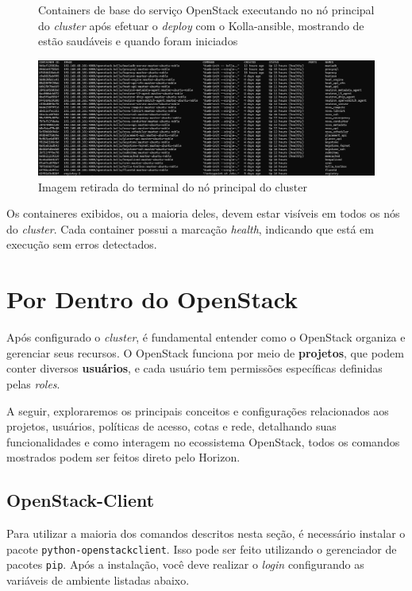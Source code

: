 \begin{figure}[htbp]
    \centering
    \caption{Containers de base do serviço OpenStack executando no nó principal do \textit{cluster} após efetuar o \textit{deploy} com o Kolla-ansible, mostrando de estão saudáveis e quando foram iniciados}
    \includegraphics[width=1.0\textwidth]{images/controller_containers.png}
    \caption{Imagem retirada do terminal do nó principal do cluster}
    \label{fig:controller_containers}
\end{figure}

Os containeres exibidos, ou a maioria deles, devem estar visíveis em todos os nós do \textit{cluster}. Cada container possui a marcação \textit{health}, indicando que está em execução sem erros detectados.

\section{Por Dentro do OpenStack}
Após configurado o \textit{cluster}, é fundamental entender como o OpenStack organiza e gerenciar seus recursos. O OpenStack funciona por meio de \textbf{projetos}, que podem conter diversos \textbf{usuários}, e cada usuário tem permissões específicas definidas pelas \textit{roles}. 

A seguir, exploraremos os principais conceitos e configurações relacionados aos projetos, usuários, políticas de acesso, cotas e rede, detalhando suas funcionalidades e como interagem no ecossistema OpenStack, todos os comandos mostrados podem ser feitos direto pelo Horizon.

\subsection{OpenStack-Client}
Para utilizar a maioria dos comandos descritos nesta seção, é necessário instalar o pacote \texttt{python-openstackclient}. Isso pode ser feito utilizando o gerenciador de pacotes \texttt{pip}. Após a instalação, você deve realizar o \textit{login} configurando as variáveis de ambiente listadas abaixo.

